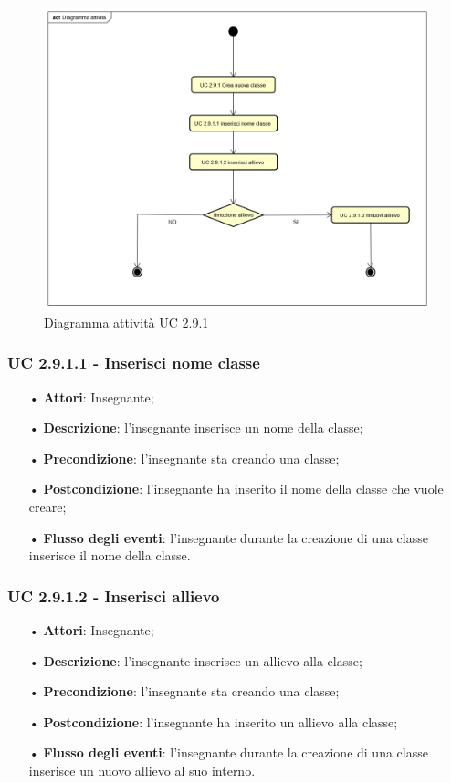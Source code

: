 \begin{figure}[H]
	\centering
	\includegraphics[width=17cm]{img/Diagramma_attivita_crea_classe.png} 
	\caption{Diagramma attività UC 2.9.1}
\end{figure}


\subsubsection{UC 2.9.1.1 - Inserisci nome classe}
\begin{itemize}
	\item[•] \textbf{Attori}: Insegnante;
	\item[•] \textbf{Descrizione}: l'insegnante inserisce un nome della classe;
	\item[•] \textbf{Precondizione}: l'insegnante sta creando una classe;
	\item[•] \textbf{Postcondizione}: l'insegnante ha inserito il nome della classe che vuole creare;
	\item[•] \textbf{Flusso degli eventi}: l'insegnante durante la creazione di una classe inserisce il nome della classe.
\end{itemize}

\subsubsection{UC 2.9.1.2 - Inserisci allievo}
\begin{itemize}
	\item[•] \textbf{Attori}: Insegnante;
	\item[•] \textbf{Descrizione}: l'insegnante inserisce un allievo alla classe;
	\item[•] \textbf{Precondizione}: l'insegnante sta creando una classe;
	\item[•] \textbf{Postcondizione}: l'insegnante ha inserito un allievo alla classe;
	\item[•] \textbf{Flusso degli eventi}: l'insegnante durante la creazione di una classe inserisce un nuovo allievo al suo interno.
\end{itemize}

